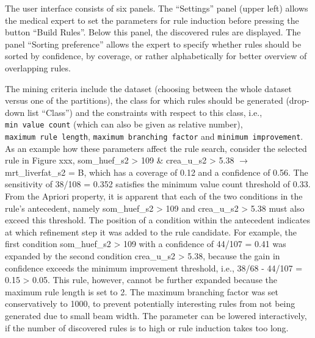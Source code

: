 \documentclass[
  oneside]{book}
\begin{document}
The user interface consists of six panels.
The ``Settings'' panel (upper left) allows the medical expert to set the parameters for rule induction before pressing the button ``Build Rules''.
Below this panel, the discovered rules are displayed.
The panel ``Sorting preference'' allows the expert to specify whether rules should be sorted by confidence, by coverage, or rather alphabetically for better overview of overlapping rules.

The mining criteria include the dataset (choosing between the whole dataset versus one of the partitions), the class for which rules should be generated (drop-down list ``Class'') and the constraints with respect to this class, i.e., \texttt{min\ value\ count} (which can also be given as relative number), \texttt{maximum\ rule\ length}, \texttt{maximum\ branching\ factor} and \texttt{minimum\ improvement}.
As an example how these parameters affect the rule search, consider the selected rule in Figure xxx, som\_huef\_s2 \textgreater{} 109 \& crea\_u\_s2 \textgreater{} 5.38 \(\longrightarrow\) mrt\_liverfat\_s2 = B, which has a coverage of 0.12 and a confidence of 0.56.
The sensitivity of 38/108 = 0.352 satisfies the minimum value count threshold of 0.33.
From the Apriori property, it is apparent that each of the two conditions in the rule's antecedent, namely som\_huef\_s2 \textgreater{} 109 and crea\_u\_s2 \textgreater{} 5.38 must also exceed this threshold.
The position of a condition within the antecedent indicates at which refinement step it was added to the rule candidate.
For example, the first condition som\_huef\_s2 \textgreater{} 109 with a confidence of 44/107 = 0.41 was expanded by the second condition crea\_u\_s2 \textgreater{} 5.38, because the gain in confidence exceeds the minimum improvement threshold, i.e., 38/68 - 44/107 = 0.15 \textgreater{} 0.05.
This rule, however, cannot be further expanded because the maximum rule length is set to 2.
The maximum branching factor was set conservatively to 1000, to prevent potentially interesting rules from not being generated due to small beam width.
The parameter can be lowered interactively, if the number of discovered rules is to high or rule induction takes too long.
\end{document}
